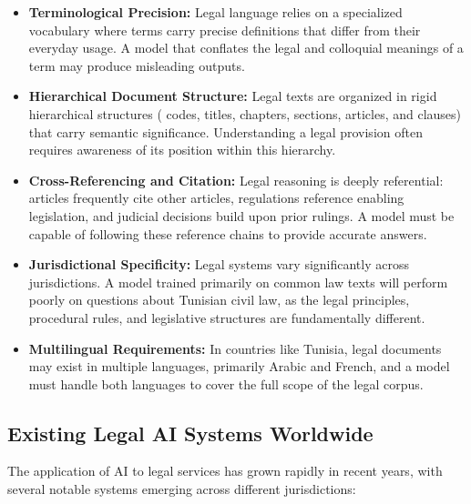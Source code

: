\begin{itemize}
    \item \textbf{Terminological Precision:} Legal language relies on a
    specialized vocabulary where terms carry precise definitions that
    differ from their everyday usage. A model that conflates the legal
    and colloquial meanings of a term may produce misleading outputs.

    \item \textbf{Hierarchical Document Structure:} Legal texts are
    organized in rigid hierarchical structures ( codes, titles, chapters,
    sections, articles, and clauses) that carry semantic significance.
    Understanding a legal provision often requires awareness of its
    position within this hierarchy.

    \item \textbf{Cross-Referencing and Citation:} Legal reasoning is
    deeply referential: articles frequently cite other articles,
    regulations reference enabling legislation, and judicial decisions
    build upon prior rulings. A model must be capable of following
    these reference chains to provide accurate answers.

    \item \textbf{Jurisdictional Specificity:} Legal systems vary
    significantly across jurisdictions. A model trained primarily on
    common law texts will perform poorly on questions about Tunisian
    civil law, as the legal principles, procedural rules, and
    legislative structures are fundamentally different.

    \item \textbf{Multilingual Requirements:} In countries like Tunisia,
    legal documents may exist in multiple languages, primarily Arabic
    and French, and a model must handle both languages to cover the
    full scope of the legal corpus.
\end{itemize}

\subsection{Existing Legal AI Systems Worldwide}

The application of \ac{AI} to legal services has grown rapidly in recent years,
with several notable systems emerging across different jurisdictions:

